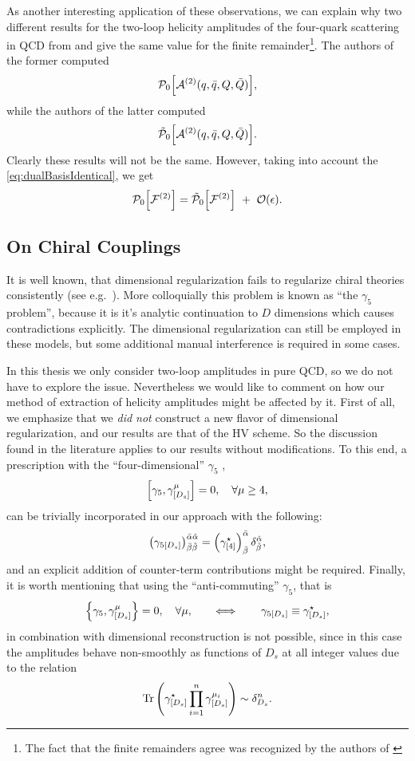 As another interesting application of these observations, we can explain why 
two different results for the two-loop helicity amplitudes of the four-quark scattering in QCD
from \cite{Glover:2004si} and \cite{DeFreitas:2004kmi} give the same
value for the finite remainder\footnote{The fact that the finite remainders agree was recognized by the authors of \cite{DeFreitas:2004kmi}}.
The authors of the former computed 
\[
  \mathcal{P}_0\qty[\mathcal{A}^{(2)}(q,\bar{q},Q,\bar{Q})],
\]
while the authors of the latter computed
\[
  \tilde{\mathcal{P}}_0\qty[\mathcal{A}^{(2)}(q,\bar{q},Q,\bar{Q})].
\]
Clearly these results will not be the same. 
However, taking into account the \cref{eq:dualBasisIdentical}, we get
\[
  \mathcal{P}_0\qty[\mathcal{F}^{(2)}] = \tilde{\mathcal{P}}_0\qty[\mathcal{F}^{(2)}] ~+~ \order{\epsilon}.
\]

\subsection{On Chiral Couplings}

It is well known, that dimensional regularization fails to regularize chiral theories consistently
(see e.g.\ \cite{Larin:1993tq,Boughezal:2019xpp,Jegerlehner:2000dz,Bonneau:1980yb,Bruque:2018bmy,Baikov:1991qz,Kreimer:1989ke}).
More colloquially this problem is known as ``the $\gamma_5$ problem'', because it is it's analytic
continuation to $D$ dimensions which causes contradictions explicitly.
The dimensional regularization can still be employed in these models, 
but some additional manual interference is required in some cases. 

In this thesis we only consider two-loop amplitudes in pure QCD, so we do not have to explore the issue. 
Nevertheless we would like to comment on how our method of extraction of helicity amplitudes might be affected by it.
First of all, we emphasize that we \emph{did not} construct a new flavor of dimensional regularization,
and our results are that of the HV scheme.  So the discussion found in the literature applies to our results without modifications.
To this end, a prescription with  the ``four-dimensional'' $\gamma_5$ \cite{tHooft:1972tcz,Breitenlohner:1977hr,Larin:1993tq},
\[\commutator{\gamma_{5}}{\gamma^{\mu}_{[D_s]}}=0, \quad \forall \mu\geq 4,\]
can be trivially incorporated in our approach with the following:
\[
  \qty(\gamma_{5[D_s]})^{\bar{\alpha}\hat{\alpha}}_{\bar{\beta}\hat{\beta}} = \qty(\gamma^\star_{[4]})^{\bar{\alpha}}_{\bar{\beta}}\,\delta^{\hat{\alpha}}_{\hat{\beta}},
\]
and an explicit addition of counter-term contributions might be required.
Finally, it is worth mentioning that using the ``anti-commuting'' $\gamma_5$, that is
\[
  \anticommutator{\gamma_{5}}{\gamma^{\mu}_{[D_s]}}=0, \quad \forall \mu, \qquad\Longleftrightarrow\qquad \gamma_{5[D_s]} \equiv \gamma^\star_{[D_s]},
\]
in combination with dimensional reconstruction is not possible, since
in this case the amplitudes behave non-smoothly as functions of $D_s$ at all integer values due to the relation
\begin{equation}
  \Tr\qty(\gamma^\star_{[D_s]} \prod_{i=1}^{n} \gamma^{\mu_i}_{[D_s]}) \sim \delta^n_{D_s}.
\end{equation}



